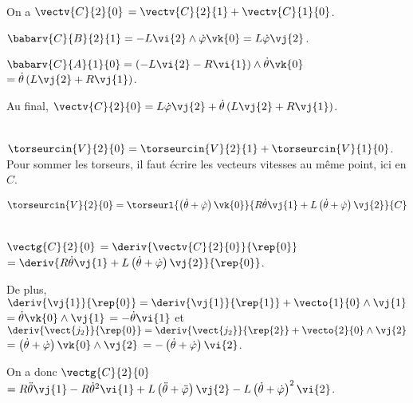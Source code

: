 \ifprof ~\\
On a $\vectv{C}{2}{0} $ $= \vectv{C}{2}{1}+\vectv{C}{1}{0}$.

$\babarv{C}{B}{2}{1} = -L\vi{2}\wedge \dot{\varphi}\vk{0}= L\dot{\varphi}\vj{2}$.

$\babarv{C}{A}{1}{0} = \left( -L\vi{2} -R\vi{1}\right)\wedge  \dot{\theta}\vk{0}$
$=\dot{\theta}\left( L\vj{2} +R\vj{1}\right)$.

Au final, $\vectv{C}{2}{0} = L\dot{\varphi}\vj{2} + \dot{\theta}\left( L\vj{2} +R\vj{1}\right)$.

\else
\fi

\ifprof ~\\
$\torseurcin{V}{2}{0}=\torseurcin{V}{2}{1}+\torseurcin{V}{1}{0}$. Pour sommer les torseurs, il faut écrire les vecteurs vitesses au même point, ici en $C$. 

$\torseurcin{V}{2}{0}=\torseurl{ \left( \dot{\theta}+\dot{\varphi}\right)\vk{0}}{R\dot{\theta}\vj{1}+L\left( \dot{\theta}+\dot{\varphi}\right)\vj{2}}{C}$
 \else
\fi

\ifprof~\\

$\vectg{C}{2}{0}$ $ = \deriv{\vectv{C}{2}{0}}{\rep{0}}$ $= \deriv{R\dot{\theta}\vj{1}+L\left( \dot{\theta}+\dot{\varphi}\right)\vj{2}}{\rep{0}}$.

De plus,  $\deriv{\vj{1}}{\rep{0}} = \deriv{\vj{1}}{\rep{1}} + \vecto{1}{0}\wedge \vj{1}$
$ =\dot{\theta}\vk{0} \wedge \vj{1} $ $=-\dot{\theta}\vi{1}$ et 
$\deriv{\vect{j_2}}{\rep{0}} = \deriv{\vect{j_2}}{\rep{2}} + \vecto{2}{0}\wedge \vj{2}$
$ = \left( \dot{\theta}+\dot{\varphi}\right)\vk{0}\wedge \vj{2}$ $ = -\left( \dot{\theta}+\dot{\varphi}\right)\vi{2}$.

On a donc $\vectg{C}{2}{0}$ $=R\ddot{\theta}\vj{1}-R\dot{\theta}^2\vi{1}+L\left( \ddot{\theta}+\ddot{\varphi}\right)\vj{2}-L\left( \dot{\theta}+\dot{\varphi}\right)^2\vi{2}$.

\else
\fi

